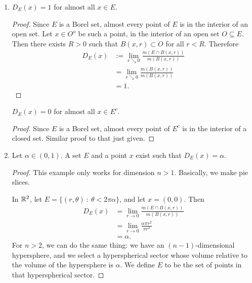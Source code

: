 \begin{enumerate}[label=(\alph*)]
\item
  \begin{claim*}
    $D_E(x) = 1$ for almost all $x \in E$.
  \end{claim*}

  \begin{proof}
    Since $E$ is a Borel set, almost every point of $E$ is in the interior of an open set. Let $x \in O^o$ be
    such a point, in the interior of an open set $O \subseteq E$. Then there exists $R > 0$ such
    that $B(x, r) \subset O$ for all $r < R$. Therefore
    \begin{align*}
      D_E(x)
      &:= \lim_{r \searrow 0} \frac{m(E \cap B(x, r))}{m(B(x, r))} \\
      &= \lim_{r \searrow 0} \frac{m(B(x, r))}{m(B(x, r))} \\
      &= 1.
    \end{align*}
  \end{proof}

  \begin{claim*}
    $D_E(x) = 0$ for almost all $x \in E^c$.
  \end{claim*}

  \begin{proof}
    Since $E$ is a Borel set, almost every point of $E^c$ is in the interior of a closed set. Similar proof to
    that just given.
  \end{proof}

\item
  \begin{claim*}
    Let $\alpha \in (0, 1)$. A set $E$ and a point $x$ exist such that $D_E(x) = \alpha$.
  \end{claim*}

  \begin{proof}
    This example only works for dimension $n > 1$. Basically, we make pie slices.

    In $\mathbb{R}^2$, let $E = \{(r, \theta) ~:~ \theta < 2\pi\alpha\}$, and let $x = (0, 0)$. Then
    \begin{align*}
      D_E(x)
      &= \lim_{r \to 0} \frac{m(E \cap B(x, r))}{m(B(x, r))} \\
      &= \lim_{r \to 0} \frac{\alpha\pi r^2}{\pi r^2} \\
      &= \alpha.
    \end{align*}
    For $n > 2$, we can do the same thing: we have an $(n-1)$-dimensional hypersphere, and we select a
    hyperspherical sector whose volume relative to the volume of the hypersphere is $\alpha$. We define $E$ to
    be the set of points in that hyperspherical sector.


\end{proof}
\end{enumerate}
